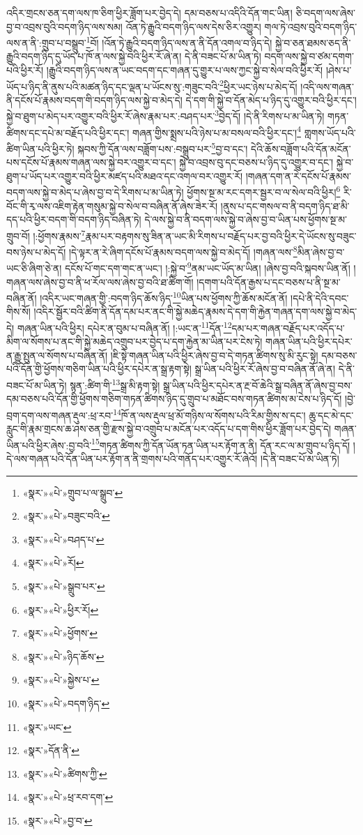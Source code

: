 འདིར་གྲངས་ཅན་དག་ལས་ཁ་ཅིག་ཕྱིར་ཟློག་པར་བྱེད་དེ། དམ་བཅས་པ་འདིའི་དོན་གང་ཡིན། ཅི་བདག་ལས་ཞེས་བྱ་བ་འབྲས་བུའི་བདག་ཉིད་ལས་སམ། འོན་ཏེ་རྒྱུའི་བདག་ཉིད་ལས་དེས་ཅིར་འགྱུར། གལ་ཏེ་འབྲས་བུའི་བདག་ཉིད་ལས་ན་ནི་:གྲུབ་པ་བསྒྲུབ་\footnote{«སྣར་»«པེ་»གྲུབ་པ་ལ་སྒྲུབ་}བོ། །འོན་ཏེ་རྒྱུའི་བདག་ཉིད་ལས་ན་ནི་དོན་འགལ་བ་ཉིད་དེ། སྐྱེ་བ་ཅན་ཐམས་ཅད་ནི་རྒྱུའི་བདག་ཉིད་དུ་ཡོད་པ་ཁོ་ན་ལས་སྐྱེ་བའི་ཕྱིར་རོ་ཞེ་ན། དེ་ནི་བཟང་པོ་མ་ཡིན་ཏེ། བདག་ལས་སྐྱེ་བ་ཙམ་དགག་པའི་ཕྱིར་རོ། །རྒྱུའི་བདག་ཉིད་ལས་ན་ཡང་བདག་དང་གཞན་དུ་གྱུར་པ་ལས་ཀྱང་སྐྱེ་བ་སེལ་བའི་ཕྱིར་རོ། །ཤེས་པ་ཡོད་པ་ཉིད་ནི་ནུས་པའི་མཚན་ཉིད་དང་ལྡན་པ་ཡོངས་སུ་:གཟུང་བའི་\footnote{«སྣར་»«པེ་»བཟུང་བའི་}ཕྱིར་ཡང་ཉེས་པ་མེད་དོ། །འདི་ལས་གཞན་ནི་དངོས་པོ་རྣམས་བདག་གི་བདག་ཉིད་ལས་སྐྱེ་བ་མེད་དེ། དེ་དག་གི་སྐྱེ་བ་དོན་མེད་པ་ཉིད་དུ་འགྱུར་བའི་ཕྱིར་དང་། སྐྱེ་བ་ཐུག་པ་མེད་པར་འགྱུར་བའི་ཕྱིར་རོ་ཞེས་རྣམ་པར་:བཤད་པར་\footnote{«སྣར་»«པེ་»བཤད་པ་}བྱེད་དོ། །དེ་ནི་རིགས་པ་མ་ཡིན་ཏེ། གཏན་ཚིགས་དང་དཔེ་མ་བརྗོད་པའི་ཕྱིར་དང་། གཞན་གྱིས་སྨྲས་པའི་ཉེས་པ་མ་བསལ་བའི་ཕྱིར་དང་།\footnote{«སྣར་»«པེ་»རོ།} གླགས་ཡོད་པའི་ཚིག་ཡིན་པའི་ཕྱིར་ཏེ། སྐབས་ཀྱི་དོན་ལས་བཟློག་པས་:བསྒྲུབ་པར་\footnote{«སྣར་»«པེ་»སྒྲུབ་པར་}བྱ་བ་དང་། དེའི་ཆོས་བཟློག་པའི་དོན་མངོན་པས་དངོས་པོ་རྣམས་གཞན་ལས་སྐྱེ་བར་འགྱུར་བ་དང་། སྐྱེ་བ་འབྲས་བུ་དང་བཅས་པ་ཉིད་དུ་འགྱུར་བ་དང་། སྐྱེ་བ་ཐུག་པ་ཡོད་པར་འགྱུར་བའི་ཕྱིར་མཛད་པའི་མཐའ་དང་འགལ་བར་འགྱུར་རོ། །གཞན་དག་ན་རེ་དངོས་པོ་རྣམས་བདག་ལས་སྐྱེ་བ་མེད་པ་ཞེས་བྱ་བ་དེ་རིགས་པ་མ་ཡིན་ཏེ། ཕྱོགས་སྔ་མ་རང་དགར་སྦྱར་བ་ལ་སེལ་བའི་ཕྱིར།\footnote{«སྣར་»«པེ་»ཕྱིར་རོ།} རི་བོང་གི་རྭ་ལས་འཇིག་རྟེན་གསུམ་སྐྱེ་བ་སེལ་བ་བཞིན་ནོ་ཞེས་ཟེར་རོ། །ནུས་པ་དང་གསལ་བ་ནི་བདག་ཉིད་ཐ་མི་དད་པའི་ཕྱིར་བདག་གི་བདག་ཉིད་བཞིན་ཏེ། དེ་ལས་སྐྱེ་བ་ནི་བདག་ལས་སྐྱེ་བ་ཞེས་བྱ་བ་ཡིན་པས་ཕྱོགས་སྔ་མ་གྲུབ་བོ། །:ཕྱོགས་རྣམས་\footnote{«སྣར་»«པེ་»ཕྱོགས་}རྣམ་པར་བརྟགས་སུ་ཟིན་ན་ཡང་མི་རིགས་པ་བརྗོད་པར་བྱ་བའི་ཕྱིར་དེ་ཡོངས་སུ་བཟུང་བས་ཉེས་པ་མེད་དོ། །དེ་ལྟར་ན་རེ་ཞིག་དངོས་པོ་རྣམས་བདག་ལས་སྐྱེ་བ་མེད་དོ། །གཞན་ལས་\footnote{«སྣར་»«པེ་»ཉིད་ཆོས་}མིན་ཞེས་བྱ་བ་ཡང་ཅི་ཞིག་ཅེ་ན། དངོས་པོ་གང་དག་གང་ན་ཡང་། །:སྐྱེ་བ་\footnote{«སྣར་»«པེ་»སྐྱེས་པ་}ནམ་ཡང་ཡོད་མ་ཡིན། །ཞེས་བྱ་བའི་སྐབས་ཡིན་ནོ། །གཞན་ལས་ཞེས་བྱ་བ་ནི་ཕ་རོལ་ལས་ཞེས་བྱ་བའི་ཐ་ཚིག་གོ། །དགག་པའི་དོན་རྒྱས་པ་དང་བཅས་པ་ནི་སྔ་མ་བཞིན་ནོ། །འདིར་ཡང་གཞན་གྱི་:བདག་ཉིད་ཆོས་ཉིད་\footnote{«སྣར་»«པེ་»བདག་ཉིད་}ཡིན་པས་ཕྱོགས་ཀྱི་ཆོས་མངོན་ནོ། །དཔེ་ནི་དེའི་དབང་གིས་སོ། །འདིར་སྦྱོར་བའི་ཚིག་ནི་དོན་དམ་པར་ནང་གི་སྐྱེ་མཆེད་རྣམས་དེ་དག་གི་རྐྱེན་གཞན་དག་ལས་སྐྱེ་བ་མེད་དེ། གཞན་ཡིན་པའི་ཕྱིར། དཔེར་ན་བུམ་པ་བཞིན་ནོ། །:ཡང་ན་\footnote{«སྣར་»ཡང་}དོན་\footnote{«སྣར་»དོན་ནི་}དམ་པར་གཞན་བརྗོད་པར་འདོད་པ་མིག་ལ་སོགས་པ་ནང་གི་སྐྱེ་མཆེད་འགྲུབ་པར་བྱེད་པ་དག་རྐྱེན་མ་ཡིན་པར་ངེས་ཏེ། གཞན་ཡིན་པའི་ཕྱིར་དཔེར་ན་རྒྱུ་སྤུན་ལ་སོགས་པ་བཞིན་ནོ། །ཇི་སྟེ་གཞན་ཡིན་པའི་ཕྱིར་ཞེས་བྱ་བ་དེ་གཏན་ཚིགས་སུ་མི་རུང་སྟེ། དམ་བཅས་པའི་དོན་གྱི་ཕྱོགས་གཅིག་ཡིན་པའི་ཕྱིར་དཔེར་ན་སྒྲ་རྟག་སྟེ། སྒྲ་ཡིན་པའི་ཕྱིར་རོ་ཞེས་བྱ་བ་བཞིན་ནོ་ཞེ་ན། དེ་ནི་བཟང་པོ་མ་ཡིན་ཏེ། སྙན་:ཚིག་གི་\footnote{«སྣར་»«པེ་»ཚིགས་ཀྱི་}སྒྲ་མི་རྟག་སྟེ། སྒྲ་ཡིན་པའི་ཕྱིར་དཔེར་ན་རྔ་བོ་ཆེའི་སྒྲ་བཞིན་ནོ་ཞེས་བྱ་བས་དམ་བཅས་པའི་དོན་གྱི་ཕྱོགས་གཅིག་གཏན་ཚིགས་ཉིད་དུ་གྲུབ་པ་མཐོང་བས་གཏན་ཚིགས་མ་ངེས་པ་ཉིད་དོ། །བྱེ་བྲག་དག་ལས་གཞན་རྡུལ་:ཕྲ་རབ་\footnote{«སྣར་»«པེ་»ཕྲ་རབ་དག་}ཁོ་ན་ལས་རྡུལ་ཕྲ་མོ་གཉིས་ལ་སོགས་པའི་རིམ་གྱིས་ས་དང་། ཆུ་དང་མེ་དང་རླུང་གི་རྣམ་གྲངས་ཆ་ཤས་ཅན་གྱི་རྫས་སྐྱེ་བ་འགྲུབ་པ་མངོན་པར་འདོད་པ་དག་གིས་ཕྱིར་ཟློག་པར་བྱེད་དེ། གཞན་ཡིན་པའི་ཕྱིར་ཞེས་:བྱ་བའི་\footnote{«སྣར་»«པེ་»བྱ་བ་}གཏན་ཚིགས་ཀྱི་དོན་ཡོན་ཏན་ཡིན་པར་རྟོག་ན་ནི། དོན་རང་ལ་མ་གྲུབ་པ་ཉིད་དོ། །དེ་ལས་གཞན་པའི་དོན་ཡིན་པར་རྟོག་ན་ནི་གྲགས་པའི་གནོད་པར་འགྱུར་རོ་ཞེའོ། །དེ་ནི་བཟང་པོ་མ་ཡིན་ཏེ། 